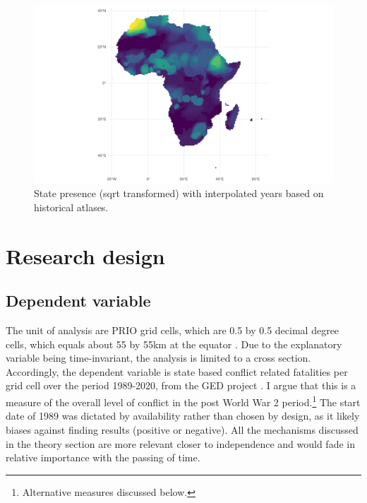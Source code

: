 \documentclass[12pt]{article}
\begin{document}
\begin{figure}[htpb]
	\centering
	\includegraphics[width=\linewidth]{../R/Output/sqrtSpAll.pdf}
	\caption{State presence (sqrt transformed) with interpolated years based
	on historical atlases.}
	\label{Sp_i}
\end{figure}



\section{Research design}

\subsection{Dependent variable}

The unit of analysis are PRIO grid cells, which are 0.5 by 0.5 decimal degree
cells, which equals about 55 by 55km at the equator \citep{Tollefsen2012}. Due
to the explanatory variable being time-invariant, the analysis is limited to a
cross section. Accordingly, the dependent variable is state based conflict
related fatalities per grid cell over the period 1989-2020, from the GED project
\citep{Sundberg2013}. I argue that this is a measure of the overall level of
conflict in the post World War 2 period.\footnote{Alternative measures discussed
below.} The start date of 1989 was dictated by availability rather than chosen
by design, as it likely biases against finding results (positive or negative).
All the mechanisms discussed in the theory section are more relevant
closer to independence and would fade in relative importance with the passing of
time.
\end{document}
